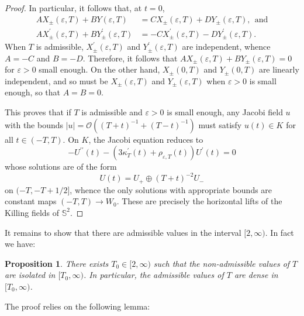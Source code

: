 \documentclass{article}
\numberwithin{equation}{section}        %
\theoremstyle{bfnote}
\newtheorem{prop}[thm]{Proposition}         %
\theoremstyle{definition}
\theoremstyle{bfremark}
\newcommand{\Sp}{\mathbb{S}}                %
\begin{document}
\begin{proof}
    In particular, it follows that, at $t = 0$, 
    \begin{align*}
        A X_\pm(\varepsilon,T) + BY(\varepsilon,T) & = C X_\pm(\varepsilon,T) + DY_\pm(\varepsilon,T), ~~ \text{and} \\
        A X^\prime_\pm(\varepsilon,T) + BY^\prime_\pm(\varepsilon,T) & = - C X^\prime_\pm(\varepsilon,T) - DY^\prime_\pm(\varepsilon,T) .
    \end{align*}
    When $T$ is admissible, $X^\prime_\pm(\varepsilon,T)$ and $Y^\prime_\pm(\varepsilon,T)$ are independent, whence $A = - C$ and $B = -D$. Therefore, it follows that $A X_\pm(\varepsilon,T) + B Y_\pm(\varepsilon,T) = 0$ for $\varepsilon > 0$ small enough. On the other hand, $X_\pm(0,T)$ and $Y_\pm(0,T)$ are linearly independent, and so must be $X_\pm(\varepsilon,T)$ and $Y_\pm(\varepsilon,T)$ when $\varepsilon > 0$ is small enough, so that $A = B = 0$.

    This proves that if $T$ is admissible and $\varepsilon > 0$ is small enough, any Jacobi field $u$ with the bounds $|u| = \mathcal{O}((T+t)^{-1} + (T-t)^{-1})$ must satisfy $u(t) \in K$ for all $t \in (-T,T)$. On $K$, the Jacobi equation reduces to
    \begin{equation*}
        -U^{\prime\prime}(t) - (3 \kappa^\prime_T(t)+\rho_{\varepsilon,T}(t)) U^\prime(t) = 0
    \end{equation*}
    whose solutions are of the form
    \begin{equation*}
        U(t) = U_+ \oplus (T+t)^{-2} U_-
    \end{equation*}
    on $(-T,-T+1/2]$, whence the only solutions with appropriate bounds are constant maps $(-T,T) \rightarrow W_0$. These are precisely the horizontal lifts of the Killing fields of $\Sp^2$.
\end{proof}

It remains to show that there are admissible values in the interval $[2,\infty)$. In fact we have:

\begin{prop}        \label{prop: Existence of admissible values}
    There exists $T_0 \in [2,\infty)$ such that the non-admissible values of $T$ are isolated in $[T_0,\infty)$. In particular, the admissible values of $T$ are dense in $[T_0,\infty)$.
\end{prop}

The proof relies on the following lemma:
\end{document}
